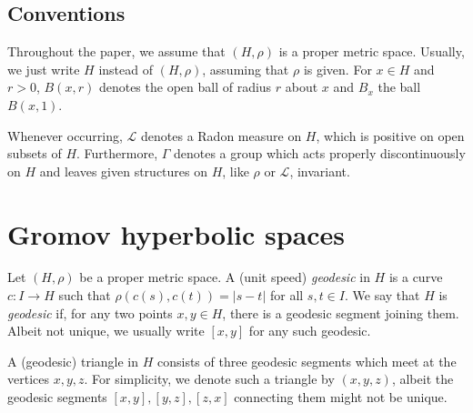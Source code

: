 \documentclass[12pt,a4paper]{amsart}
\numberwithin{equation}{section}
\theoremstyle{definition}
\begin{document}
\subsection{Conventions}\label{convent}
Throughout the paper, we assume that $(H,\rho)$ is a proper metric space.
Usually, we just write $H$ instead of $(H,\rho)$, assuming that $\rho$ is given.
For $x\in H$ and $r>0$, $B(x,r)$ denotes the open ball of radius $r$ about $x$ and $B_x$ the ball $B(x,1)$.

Whenever occurring, $\mathcal{L}$ denotes a Radon measure on $H$, which is positive on open subsets of $H$.
Furthermore, $\Gamma$ denotes a group which acts properly discontinuously on $H$ and leaves given structures on $H$, like $\rho$ or $\mathcal L$, invariant.

\section{Gromov hyperbolic spaces}\label{sechyp}
Let $(H,\rho)$ be a proper metric space.
A (unit speed) \emph{geodesic} in $H$ is a curve $c\colon I\to H$ such that $\rho(c(s),c(t))=|s-t|$ for all $s,t\in I$.
We say that $H$ is \emph{geodesic} if, for any two points $x,y\in H$, there is a geodesic segment joining them.
Albeit not unique, we usually write $[x,y]$ for any such geodesic.

A (geodesic) triangle in $H$ consists of three geodesic segments which meet at the vertices $x,y,z$.
For simplicity, we denote such a triangle by $(x,y,z)$, albeit the geodesic segments $[x,y],[y,z],[z,x]$ connecting them might not be unique.

\end{document}

